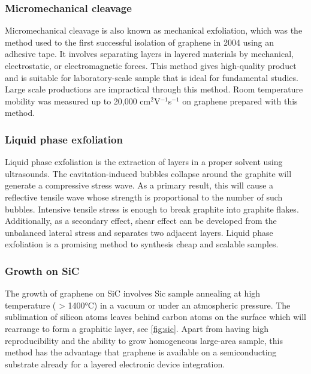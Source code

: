 \subsubsection{Micromechanical cleavage}

Micromechanical cleavage is also known as mechanical exfoliation, which was the method used to the first successful isolation of graphene in 2004 using an adhesive tape\cite{Novoselov26072005}. It involves separating layers in layered materials by mechanical, electrostatic, or electromagnetic forces. This method gives high-quality product and is suitable for laboratory-scale sample that is ideal for fundamental studies. Large scale productions are impractical through this method.  Room temperature mobility was measured up to 20,000 cm$^2$V$^{-1}$s$^{-1}$\cite{Ni2010} on graphene prepared with this method.

\subsubsection{Liquid phase exfoliation}

Liquid phase exfoliation is the extraction of layers in a proper solvent using ultrasounds. The cavitation-induced bubbles collapse around the graphite will generate a compressive stress wave. As a primary result, this will cause a reflective tensile wave whose strength is proportional to the number of such bubbles. Intensive tensile stress is enough to break graphite into graphite flakes. Additionally, as a secondary effect, shear effect can be developed from the unbalanced lateral stress and separates two adjacent layers. Liquid phase exfoliation is a promising method to synthesis cheap and scalable samples. 

\subsubsection{Growth on SiC}

The growth of graphene on SiC involves Sic sample annealing at high temperature ( > 1400\si{\celsius}) in a vacuum or under an atmospheric pressure. The sublimation of silicon atoms leaves behind carbon atoms on the surface which will rearrange to form a graphitic layer\cite{Mishra2016}, see \autoref{fig:sic}. Apart from having high reproducibility and the ability to grow homogeneous large-area sample, this method has the advantage that graphene is available on a semiconducting substrate already for a layered electronic device integration. 

